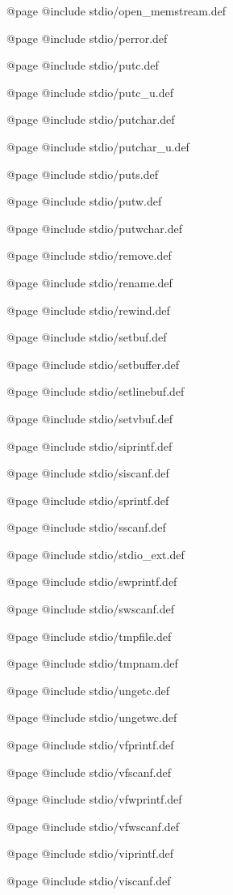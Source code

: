 @page
@include stdio/open_memstream.def

@page
@include stdio/perror.def

@page
@include stdio/putc.def

@page
@include stdio/putc_u.def

@page
@include stdio/putchar.def

@page
@include stdio/putchar_u.def

@page
@include stdio/puts.def

@page
@include stdio/putw.def

@page
@include stdio/putwchar.def

@page
@include stdio/remove.def

@page
@include stdio/rename.def

@page
@include stdio/rewind.def

@page
@include stdio/setbuf.def

@page
@include stdio/setbuffer.def

@page
@include stdio/setlinebuf.def

@page
@include stdio/setvbuf.def

@page
@include stdio/siprintf.def

@page
@include stdio/siscanf.def

@page
@include stdio/sprintf.def

@page
@include stdio/sscanf.def

@page
@include stdio/stdio_ext.def

@page
@include stdio/swprintf.def

@page
@include stdio/swscanf.def

@page
@include stdio/tmpfile.def

@page
@include stdio/tmpnam.def

@page
@include stdio/ungetc.def

@page
@include stdio/ungetwc.def

@page
@include stdio/vfprintf.def

@page
@include stdio/vfscanf.def

@page
@include stdio/vfwprintf.def

@page
@include stdio/vfwscanf.def

@page
@include stdio/viprintf.def

@page
@include stdio/viscanf.def
